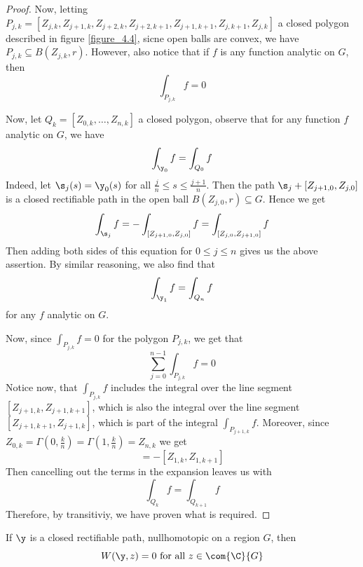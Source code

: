 \begin{proof}
    Now, letting $P_{j,k}=[Z_{j,k}, Z_{j+1,k}, Z_{j+2,k}, Z_{j+2,k+1},
    Z_{j+1,k+1}, Z_{j,k+1}, Z_{j,k}]$ a closed polygon described in figure
    \ref{figure_4.4}, sicne open balls are convex, we have  $P_{j,k} \subseteq
    B(Z_{j,k},r)$. However, also notice that if $f$ is any function analytic on
     $G$, then
     \begin{equation*}
         \int_{P_{j,k}}{f}=0
     \end{equation*}

     Now, let $Q_k=[Z_{0,k}, \dots, Z_{n,k}]$ a closed polygon, observe that for
     any function $f$ analytic on $G$, we have
     \begin{equation*}
         \int_{\y_0}{f}=\int_{Q_0}{f}
     \end{equation*}
     Indeed, let $\s_j(s)=\y_0(s)$ for all $\frac{j}{n} \leq s \leq
     \frac{j+1}{n}$. Then the path $\s_j+[Z_{j+1,0},Z_{j,0}]$ is a closed
     rectifiable path in the open ball $B(Z_{j,0},r) \subseteq G$. Hence we get
     \begin{equation*}
         \int_{\s_j}{f}=-\int_{[Z_{j+1,0},Z_{j,0}]}{f}=
         \int_{[Z_{j,0},Z_{j+1,0}]}{f}
     \end{equation*}
     Then adding both sides of this equation for $0 \leq j \leq n$ gives us the
     above assertion. By similar reasoning, we also find that
     \begin{equation*}
         \int_{\y_1}{f}=\int_{Q_n}{f}
     \end{equation*}
     for any $f$ analytic on $G$.

     Now, since $\int_{P_{j,k}}{f}=0$ for the polygon $P_{j,k}$, we get that
     \begin{equation*}
         \sum_{j=0}^{n-1}{\int_{P_{j,k}}{f}}=0
     \end{equation*}
     Notice now, that $\int_{P_{j,k}}{f}$ includes the integral over the line
     segment $[Z_{j+1,k}, Z_{j+1,k+1}]$, which is also the integral over the
     line segment $[Z_{j+1,k+1}, Z_{j+1,k}]$, which is part of the integral
     $\int_{P_{j+1,k}}{f}$. Moreover, since
     $Z_{0,k}=\Gamma(0,\frac{k}{n})=\Gamma(1,\frac{k}{n})=Z_{n,k}$ we get
     \begin{equation*}
         [Z_{o,k+1},Z_{0,k}]=-[Z_{1,k},Z_{1,k+1}]
     \end{equation*}
     Then cancelling out the terms in the expansion leaves us with
     \begin{equation*}
         \int_{Q_k}{f}=\int_{Q_{k+1}}{f}
     \end{equation*}
     Therefore, by transitiviy, we have proven what is required.
\end{proof}
\begin{corollary}
    If $\y$ is a closed rectifiable path, nullhomotopic on a region  $G$, then
    \begin{equation*}
        W(\y,z)=0 \text{ for all } z \in \com{\C}{G}
    \end{equation*}
\end{corollary}

